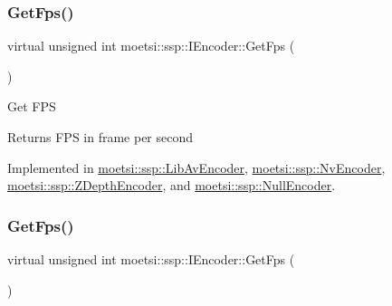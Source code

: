 \mbox{\label{classmoetsi_1_1ssp_1_1IEncoder_ae6a865aa52230d81aed1cb5232402f6c}} 
\subsubsection{\texorpdfstring{Get\+Fps()}{GetFps()}\hspace{0.1cm}{\footnotesize\ttfamily [1/2]}}
{\footnotesize\ttfamily virtual unsigned int moetsi\+::ssp\+::\+I\+Encoder\+::\+Get\+Fps (\begin{DoxyParamCaption}{ }\end{DoxyParamCaption})\hspace{0.3cm}{\ttfamily [pure virtual]}}

Get F\+PS \begin{DoxyReturn}{Returns}
F\+PS in frame per second 
\end{DoxyReturn}


Implemented in \hyperlink{classmoetsi_1_1ssp_1_1LibAvEncoder_ae21f81cb967359132183a29e04307933}{moetsi\+::ssp\+::\+Lib\+Av\+Encoder}, \hyperlink{classmoetsi_1_1ssp_1_1NvEncoder_ab94b826f2aef05afad376132743001d9}{moetsi\+::ssp\+::\+Nv\+Encoder}, \hyperlink{classmoetsi_1_1ssp_1_1ZDepthEncoder_a9ea0a5783d7d265fccc3a2c262600552}{moetsi\+::ssp\+::\+Z\+Depth\+Encoder}, and \hyperlink{classmoetsi_1_1ssp_1_1NullEncoder_ad6727fa08528622081aa4eca4aacc6c1}{moetsi\+::ssp\+::\+Null\+Encoder}.

\mbox{\label{classmoetsi_1_1ssp_1_1IEncoder_ae6a865aa52230d81aed1cb5232402f6c}} 
\subsubsection{\texorpdfstring{Get\+Fps()}{GetFps()}\hspace{0.1cm}{\footnotesize\ttfamily [2/2]}}
{\footnotesize\ttfamily virtual unsigned int moetsi\+::ssp\+::\+I\+Encoder\+::\+Get\+Fps (\begin{DoxyParamCaption}{ }\end{DoxyParamCaption})\hspace{0.3cm}{\ttfamily [pure virtual]}}

